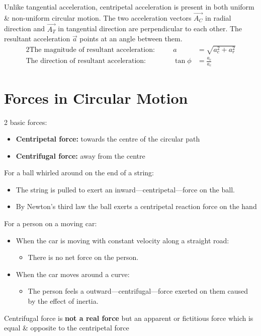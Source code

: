 Unlike tangential acceleration,
centripetal acceleration is present in both uniform \& non-uniform circular motion.
The two acceleration vectors
$\vec{A_C}$ in radial direction and
$\vec{A_T}$ in tangential direction
are perpendicular to each other.
The resultant acceleration $\vec{a}$ points at an angle
between them.
\begin{alignat}{2}
	\text{The magnitude of resultant acceleration:}&&\quad
	a &= \sqrt{a_c^2 + a_r^2} \\
	\text{The direction of resultant acceleration:}&&\quad
	\tan\phi &= \frac{a_r}{a_c}
\end{alignat}


\section{Forces in Circular Motion}
2 basic forces:
\begin{itemize}
	\item \textbf{Centripetal force:} towards the centre of the circular path
	\item \textbf{Centrifugal force:} away from the centre
\end{itemize}

\noindent
For a ball whirled around on the end of a string:
\begin{itemize}
	\item The string is pulled to exert an inward---centripetal---force on the ball.
	\item By Newton's third law the ball exerts a centripetal reaction force on the hand
\end{itemize}

For a person on a moving car:
\begin{itemize}
	\item When the car is moving with constant velocity along a straight road:
		\begin{itemize}
			\item	There is no net force on the person.
		\end{itemize}
	\item When the car moves around a curve:
		\begin{itemize}
			\item The person feels a outward---centrifugal---force exerted on them
				caused by the effect of inertia.
		\end{itemize}
\end{itemize}

Centrifugal force is \textbf{not a real force}
but an apparent or fictitious force which is equal \& opposite to the centripetal force


